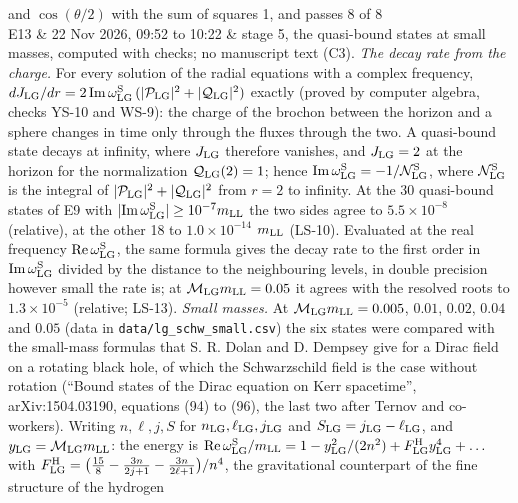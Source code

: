 \documentclass[
  10pt,
]{article}
\begin{document}
\begin{longtable}[]
and \(\cos(\theta/2)\) with the sum of squares 1, and passes 8 of 8 \\
E13 & 22 Nov 2026, 09:52 to 10:22 & stage 5, the quasi-bound states at
small masses, computed with checks; no manuscript text (C3). \emph{The
decay rate from the charge.} For every solution of the radial equations
with a complex frequency,
\(dJ_{\rm LG}/dr=2\,{\rm Im}\,\omega^{\rm S}_{\rm LG}\,(\lvert\mathcal P_{\rm LG}\rvert^2+\lvert\mathcal Q_{\rm LG}\rvert^2)\)
exactly (proved by computer algebra, checks YS-10 and WS-9): the charge
of the brochon between the horizon and a sphere changes in time only
through the fluxes through the two. A quasi-bound state decays at
infinity, where \(J_{\rm LG}\) therefore vanishes, and \(J_{\rm LG}=2\)
at the horizon for the normalization \(\mathcal Q_{\rm LG}(2)=1\); hence
\({\rm Im}\,\omega^{\rm S}_{\rm LG}=-1/\mathcal N^{\rm S}_{\rm LG}\),
where \(\mathcal N^{\rm S}_{\rm LG}\) is the integral of
\(\lvert\mathcal P_{\rm LG}\rvert^2+\lvert\mathcal Q_{\rm LG}\rvert^2\)
from \(r=2\) to infinity. At the 30 quasi-bound states of E9 with
\(\lvert{\rm Im}\,\omega^{\rm S}_{\rm LG}\rvert\ge10^{-7}m_{\rm LL}\)
the two sides agree to \(5.5\times10^{-8}\) (relative), at the other 18
to \(1.0\times10^{-14}\) \(m_{\rm LL}\) (LS-10). Evaluated at the real
frequency \({\rm Re}\,\omega^{\rm S}_{\rm LG}\), the same formula gives
the decay rate to the first order in
\({\rm Im}\,\omega^{\rm S}_{\rm LG}\) divided by the distance to the
neighbouring levels, in double precision however small the rate is; at
\(\mathcal M_{\rm LG}m_{\rm LL}=0.05\) it agrees with the resolved roots
to \(1.3\times10^{-5}\) (relative; LS-13). \emph{Small masses.} At
\(\mathcal M_{\rm LG}m_{\rm LL}=0.005\), \(0.01\), \(0.02\), \(0.04\)
and \(0.05\) (data in \texttt{data/lg\_schw\_small.csv}) the six states
were compared with the small-mass formulas that S. R. Dolan and D.
Dempsey give for a Dirac field on a rotating black hole, of which the
Schwarzschild field is the case without rotation (``Bound states of the
Dirac equation on Kerr spacetime'', arXiv:1504.03190, equations (94) to
(96), the last two after Ternov and co-workers). Writing \(n,\ell,j,S\)
for \(n_{\rm LG},\ell_{\rm LG},j_{\rm LG}\) and
\(S_{\rm LG}=j_{\rm LG}-\ell_{\rm LG}\), and
\(y_{\rm LG}=\mathcal M_{\rm LG}m_{\rm LL}\): the energy is
\({\rm Re}\,\omega^{\rm S}_{\rm LG}/m_{\rm LL}=1-y_{\rm LG}^2/(2n^2)+F^{\rm H}_{\rm LG}y_{\rm LG}^4+\dots\)
with
\(F^{\rm H}_{\rm LG}=\big(\tfrac{15}8-\tfrac{3n}{2j+1}-\tfrac{3n}{2\ell+1}\big)/n^4\),
the gravitational counterpart of the fine structure of the hydrogen

\end{longtable}
\end{document}
